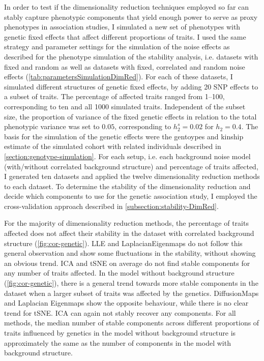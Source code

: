 In order to test if the dimensionality reduction techniques employed so far can stably capture phenotypic components that yield enough power to serve as proxy phenotypes in association studies, I simulated a new set of phenotypes with genetic fixed effects that affect different proportions of traits. I used the same strategy and parameter settings for the simulation of the noise effects as described for the phenotype simulation of the stability analysis, i.e. datasets with fixed and random as well as datasets with fixed, correlated and random noise effects (\cref{tab:parametersSimulationDimRed}). For each of these datasets, I simulated different structures of genetic fixed effects, by adding \num{20} SNP effects to a subset of traits. The percentage of affected traits ranged from \numrange{1}{100}, corresponding to ten and all \num{1000} simulated traits. Independent of the subset size, the proportion of variance of the fixed genetic effects in relation to the total phenotypic variance was set to \(0.05\), corresponding to \(h^s_2=0.02\) for \(h_2=0.4\). The basis for the simulation of the genetic effects were the gentoypes and kinship estimate of the simulated cohort with related individuals described in \cref{section:genotype-simulation}.  For each setup, i.e. each background noise model (with/without correlated background structure) and percentage of traits affected, I generated ten datasets and applied the twelve dimensionality reduction methods to each dataset. To determine the stability of the dimensionality reduction and decide which components to use for the genetic association study, I employed the cross-validation approach described in \cref{subsection:stability-DimRed}. 

For the majority of dimensionality reduction methods, the percentage of traits affected does not affect their stability in the dataset with correlated background structure (\cref{fig:cor-genetic}). LLE and LaplacianEigenmaps do not follow this general observation and show some fluctuations in the stability, without showing an obvious trend.  ICA and tSNE on average do not find stable components for any number of traits affected. In the model without background structure (\cref{fig:cor-genetic}), there is a general trend towards more stable components in the dataset when a larger subset of traits was affected by the genetics. DiffusionMaps and Laplacian Eigenmaps show the opposite behaviour, while there is no clear trend for tSNE. ICA can again not stably recover any components. For all methods, the median number of stable components across different proportions of traits influenced by genetics in the model without background structure is approximately the same as the number of components in the model with background structure. 


